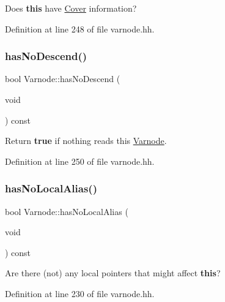 Does {\bfseries{this}} have \mbox{\hyperlink{class_cover}{Cover}} information? 



Definition at line 248 of file varnode.\+hh.

\mbox{\label{class_varnode_a31e0233982910746322b8040fe3341e0}} 
\subsubsection{\texorpdfstring{hasNoDescend()}{hasNoDescend()}}
{\footnotesize\ttfamily bool Varnode\+::has\+No\+Descend (\begin{DoxyParamCaption}\item[{void}]{ }\end{DoxyParamCaption}) const\hspace{0.3cm}{\ttfamily [inline]}}



Return {\bfseries{true}} if nothing reads this \mbox{\hyperlink{class_varnode}{Varnode}}. 



Definition at line 250 of file varnode.\+hh.

\mbox{\label{class_varnode_a3af89619c25ba464f9f1c9e61c8b2d96}} 
\subsubsection{\texorpdfstring{hasNoLocalAlias()}{hasNoLocalAlias()}}
{\footnotesize\ttfamily bool Varnode\+::has\+No\+Local\+Alias (\begin{DoxyParamCaption}\item[{void}]{ }\end{DoxyParamCaption}) const\hspace{0.3cm}{\ttfamily [inline]}}



Are there (not) any local pointers that might affect {\bfseries{this}}? 



Definition at line 230 of file varnode.\+hh.

\mbox{\label{class_varnode_a0750524b7c076892cf123c37b00db5af}} 

